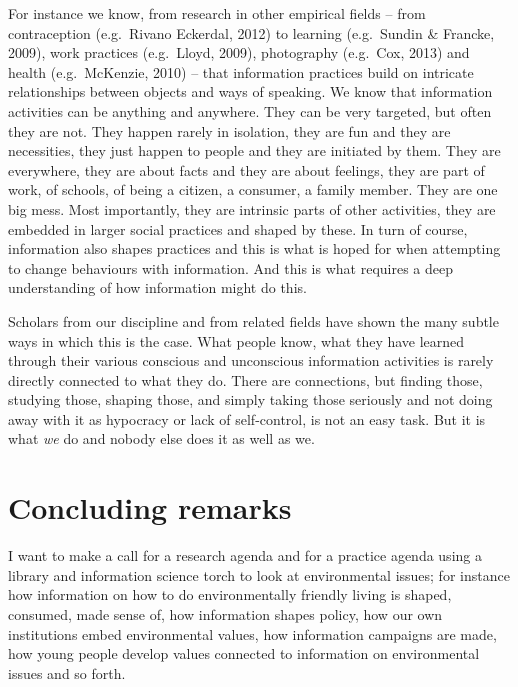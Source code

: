 ﻿\documentclass[a4paper,
fontsize=11pt,
oneside,
numbers=noperiodatend,
parskip=half-,
bibliography=totoc,
final
]{scrartcl}
\begin{document}
For instance we know, from research in other empirical fields -- from
contraception (e.g.~Rivano Eckerdal, 2012) to learning (e.g.~Sundin \&
Francke, 2009), work practices (e.g.~Lloyd, 2009), photography
(e.g.~Cox, 2013) and health (e.g.~McKenzie, 2010) -- that information
practices build on intricate relationships between objects and ways of
speaking. We know that information activities can be anything and
anywhere. They can be very targeted, but often they are not. They happen
rarely in isolation, they are fun and they are necessities, they just
happen to people and they are initiated by them. They are everywhere,
they are about facts and they are about feelings, they are part of work,
of schools, of being a citizen, a consumer, a family member. They are
one big mess. Most importantly, they are intrinsic parts of other
activities, they are embedded in larger social practices and shaped by
these. In turn of course, information also shapes practices and this is
what is hoped for when attempting to change behaviours with information.
And this is what requires a deep understanding of how information might
do this.

Scholars from our discipline and from related fields have shown the many
subtle ways in which this is the case. What people know, what they have
learned through their various conscious and unconscious information
activities is rarely directly connected to what they do. There are
connections, but finding those, studying those, shaping those, and
simply taking those seriously and not doing away with it as hypocracy or
lack of self-control, is not an easy task. But it is what \emph{we} do
and nobody else does it as well as we.

\section*{Concluding remarks}\label{concluding-remarks}

I want to make a call for a research agenda and for a practice agenda
using a library and information science torch to look at environmental
issues; for instance how information on how to do environmentally
friendly living is shaped, consumed, made sense of, how information
shapes policy, how our own institutions embed environmental values, how
information campaigns are made, how young people develop values
connected to information on environmental issues and so forth.
\end{document}
